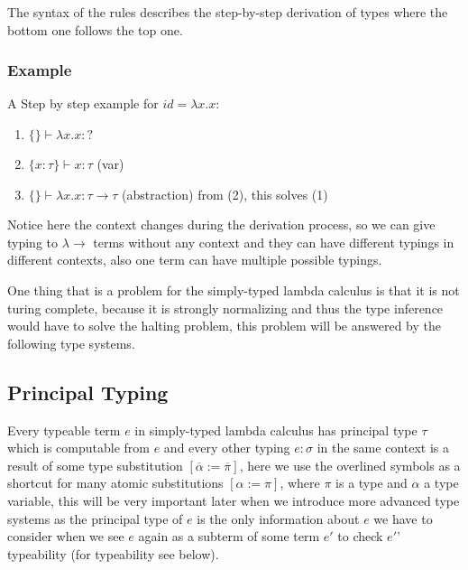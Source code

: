 The syntax of the rules describes the step-by-step derivation of types where the bottom one follows the top one. %

\subsubsection{Example}
A Step by step example for $id = \lambda x . x$:

\begin{enumerate}
    \item $\{\} \vdash \lambda x . x : ?$
    \item $\{x : \tau\} \vdash x : \tau$ (var)
    \item $\{\} \vdash \lambda x . x : \tau \rightarrow \tau$ (abstraction) from (2), this solves (1)
\end{enumerate}

Notice here the context changes during the derivation process, so we can give typing to $\lambda\rightarrow$ terms without any context and they can have different typings in different contexts, also one term can have multiple possible typings.


One thing that is a problem for the simply-typed lambda calculus is that it is not turing complete, %
because it is strongly normalizing and thus the type inference would have to solve the halting problem, this problem will be answered by the following type systems.

\subsection{Principal Typing}

Every typeable term $e$ in simply-typed lambda calculus has principal type $\tau$ which is computable from $e$ and every other typing $e : \sigma$ in the same context is a result of some type substitution $[\overline{\alpha} := \overline{\pi}]$, here we use the overlined symbols as a shortcut for many atomic substitutions $[\alpha := \pi]$, where $\pi$ is a type and $\alpha$ a type variable, this will be very important later when we introduce more advanced type systems as the principal type of $e$ is the only information about $e$ we have to consider when we see $e$ again as a subterm of some term $e'$ to check $e'$' typeability (for typeability see below). %


